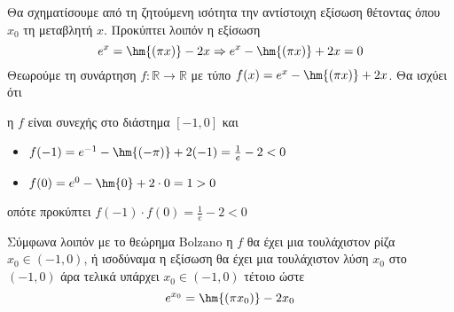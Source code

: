 Θα σχηματίσουμε από τη ζητούμενη ισότητα την αντίστοιχη εξίσωση θέτοντας όπου $ x_0 $ τη μεταβλητή $ x $. Προκύπτει λοιπόν η εξίσωση
\[ e^{x}=\hm{(\pi x)}-2x\Rightarrow e^{x}-\hm{(\pi x)}+2x=0 \]
Θεωρούμε τη συνάρτηση $ f:\mathbb{R}\to\mathbb{R} $ με τύπο $ f(x)=e^{x}-\hm{(\pi x)}+2x $. Θα ισχύει ότι
\begin{rlist}
\item η $ f $ είναι συνεχής στο διάστημα $ [-1,0] $ και
\item \begin{itemize}
\item $ f(-1)=e^{-1}-\hm{(-\pi)}+2(-1)=\frac{1}{e}-2<0 $
\item $ f(0)=e^0-\hm{0}+2\cdot 0=1>0 $
\end{itemize}
οπότε προκύπτει $ f(-1)\cdot f(0)=\frac{1}{e}-2<0 $
\end{rlist}
Σύμφωνα λοιπόν με το θεώρημα Bolzano η $ f $ θα έχει μια τουλάχιστον ρίζα $ x_0\in(-1,0) $, ή ισοδύναμα η εξίσωση θα έχει μια τουλάχιστον λύση $ x_0 $ στο $ (-1,0) $ άρα τελικά υπάρχει $ x_0\in(-1,0) $ τέτοιο ώστε
\[ e^{x_0}=\hm{(\pi x_0)}-2x_0 \]
